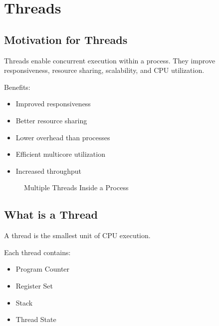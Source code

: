 \chapter{Threads}

\section{Motivation for Threads}

Threads enable concurrent execution within a process. They improve responsiveness, resource sharing, scalability, and CPU utilization.

Benefits:

\begin{itemize}
\item Improved responsiveness
\item Better resource sharing
\item Lower overhead than processes
\item Efficient multicore utilization
\item Increased throughput
\end{itemize}

\begin{figure}[H]
\centering
{}
\caption{Multiple Threads Inside a Process}
\end{figure}

\section{What is a Thread}

A thread is the smallest unit of CPU execution.

Each thread contains:

\begin{itemize}
\item Program Counter
\item Register Set
\item Stack
\item Thread State
\end{itemize}

